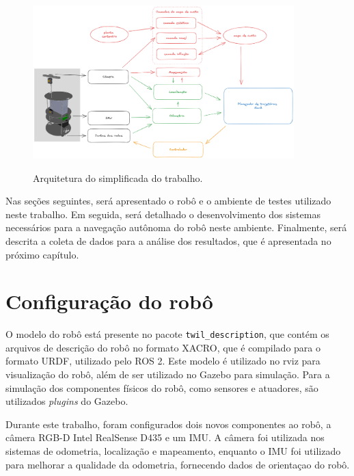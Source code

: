 \documentclass[repeatfields,xlists,xpacks,oneside,yearsonly]{ufrgscca}
\begin{document}
\begin{figure}[h]
    {
        \centering
        \caption{Arquitetura do simplificada do trabalho.}
        \label{fig:arq_trabalho}
        \includegraphics[width=0.9\textwidth]{arquitetura_simplificada.png}\\
    }
    {}
\end{figure}

Nas seções seguintes, será apresentado o robô e o ambiente de testes
utilizado neste trabalho.
Em seguida, será detalhado o desenvolvimento dos sistemas necessários
para a navegação autônoma do robô neste ambiente.
Finalmente, será descrita a coleta de dados para a análise dos resultados,
que é apresentada no próximo capítulo.

\section{Configuração do robô}



O modelo do robô está presente no pacote \texttt{twil\_description}, que contém
os arquivos de descrição do robô no formato XACRO, que é compilado para o formato
URDF, utilizado pelo ROS 2.
Este modelo é utilizado no rviz para visualização do robô, além de ser utilizado
no Gazebo para simulação.
Para a simulação dos componentes físicos do robô, como sensores e atuadores, 
são utilizados \textit{plugins} do Gazebo.


Durante este trabalho, foram configurados dois novos componentes ao robô, a câmera 
RGB-D Intel RealSense D435 e um IMU.
A câmera foi utilizada nos sistemas de odometria, localização e mapeamento, 
enquanto o IMU foi utilizado para melhorar a qualidade da odometria,
fornecendo dados de orientaçao do robô.
\end{document}
